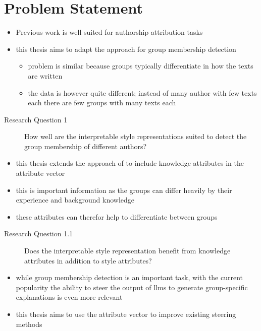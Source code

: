 \section{Problem Statement}
\label{sec:introduction:problemStatement}

\begin{itemize}
  \item Previous work is well suited for authorship attribution tasks
  \item this thesis aims to adapt the approach for group membership detection
        \begin{itemize}
          \item problem is similar because groups typically differentiate in how the texts are written
          \item the data is however quite different; instead of many author with few texts each there are few groups with many texts each
        \end{itemize}
\end{itemize}

\begin{description}
  \item[Research Question 1] How well are the interpretable style representations suited to detect the group membership of different authors?
\end{description}

\begin{itemize}
  \item this thesis extends the approach of \citet{patelLearningInterpretableStyle2023} to include knowledge attributes in the attribute vector
  \item this is important information as the groups can differ heavily by their experience and background knowledge
  \item these attributes can therefor help to differentiate between groups
\end{itemize}
\begin{description}
  \item[Research Question 1.1] Does the interpretable style representation benefit from knowledge attributes in addition to style attributes?
\end{description}

\begin{itemize}
  \item while group membership detection is an important task, with the current popularity the ability to steer the output of \acp{llm} to generate group-specific explanations is even more relevant
  \item this thesis aims to use the attribute vector to improve existing steering methods
\end{itemize}

